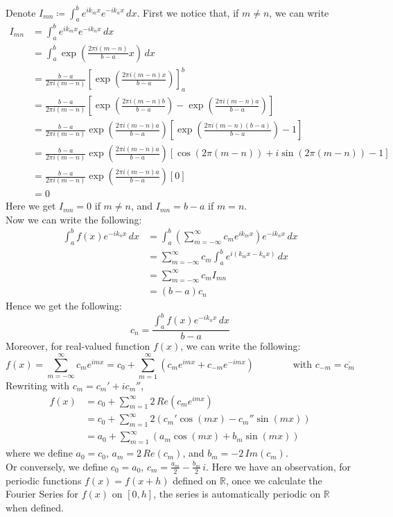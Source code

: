 \documentclass[11pt]{article}
\theoremstyle{break}
\theoremstyle{break}
\newcommand{\R}{\mathbb{R}}
\begin{document}
Denote $I_{mn} \coloneqq \int_a^b e^{ik_mx}e^{-ik_nx}\, dx$. First we notice that, if $m\neq n$, we can write
\begin{align*}
I_{mn} &= \int_a^b e^{ik_mx}e^{-ik_nx}\, dx\\
&=\int_a^b \exp\left(\frac{2\pi i(m-n)}{b-a}x \right)\, dx\\
&=\frac{b-a}{2\pi i(m-n)}\left[\exp\left(\frac{2\pi i(m-n)x}{b-a}\right) \right]_a^b\\
&=\frac{b-a}{2\pi i(m-n)}\left[\exp\left(\frac{2\pi i(m-n)b}{b-a}\right)-\exp\left(\frac{2\pi i(m-n)a}{b-a}\right) \right]\\
&=\frac{b-a}{2\pi i(m-n)}\exp\left(\frac{2\pi i(m-n)a}{b-a}\right)\left[\exp\left(\frac{2\pi i(m-n)(b-a)}{b-a}\right)-1 \right]\\
&=\frac{b-a}{2\pi i(m-n)}\exp\left(\frac{2\pi i(m-n)a}{b-a}\right)\left[\cos(2\pi(m-n))+ i\sin(2\pi(m-n))-1 \right]\\
&=\frac{b-a}{2\pi i(m-n)}\exp\left(\frac{2\pi i(m-n)a}{b-a}\right)\left[0 \right]\\
&=0
\end{align*}
Here we get $I_{mn} = 0$ if $m\neq n$, and $I_{mn} = b-a$ if $m=n$. \\
Now we can write the following:
\begin{align*}
\int_a^b f(x) e^{-ik_n x}\, dx &= \int_a^b \left(\sum_{m=-\infty}^{\infty} c_m e^{ik_m  x} \right) e^{-ik_n x}\, dx \\
&=\sum_{m=-\infty}^\infty c_m \int_a^b e^{i(k_mx-k_nx)}\, dx \\
&= \sum_{m=-\infty}^\infty c_m I_{mn}\\
&= (b-a)c_n
\end{align*}
Hence we get the following:
$$c_n = \frac{\int_a^b f(x)e^{-ik_n x} \, dx}{b-a}$$
Moreover, for real-valued function $f(x)$, we can write the following:
$$f(x) = \sum_{m=-\infty}^\infty c_m e^{imx} = c_0 + \sum_{m=1}^\infty (c_m e^{imx} + c_{-m} e^{-imx} )
\qquad\qquad\text{with }c_{-m} = \overline{c_m}$$
Rewriting with $c_m = c_m' + ic_m''$, 
\begin{align*}
f(x) &= c_0 + \sum_{m=1}^\infty 2\, Re(c_m e^{imx})\\
&= c_0 + \sum_{m=1}^\infty 2(c_m'\cos(mx) - c_m''\sin(mx))\\
&= a_0 + \sum_{m=1}^\infty (a_m\cos(mx) + b_m \sin(mx))
\end{align*}
where we define $a_0 = c_0$, $a_m = 2\,Re(c_m)$, and $b_m = -2\,Im(c_m)$. \\
Or conversely, we define $c_0 = a_0$, $c_m = \frac{a_m}{2} - \frac{b_m}{2}\, i$.
\newpage
Here we have an observation, for periodic functions $f(x) = f(x+h)$ defined on $\R$, once we calculate the Fourier Series for $f(x)$ on $[0,h]$, the series is automatically periodic on $\R$ when defined.\\
\end{document}
